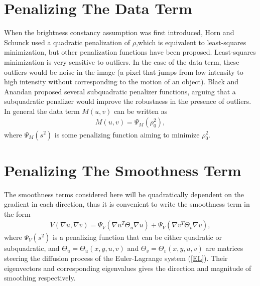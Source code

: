 \section{Penalizing The Data Term}
\label{sec:Data_penalization}
When the brightness constancy assumption was first introduced, Horn and Schunck used a quadratic penalization of $\rho$,which is equivalent to least-squares minimization, but other penalization functions have been proposed. Least-squares minimization is very sensitive to outliers. In the case of the data term, these outliers would be noise in the image (a pixel that jumps from low intensity to high intensity without corresponding to the motion of an object). Black and Anandan \cite{Black199675} proposed several subquadratic penalizer functions, arguing that a subquadratic penalizer would improve the robustness in the presence of outliers. In general the data term $M(u,v)$ can be written as
\begin{align}
\label{DataPenalize}
M(u,v) = \Psi_M(\rho_0^2),
\end{align}
where $\Psi_M(s^2)$ is some penalizing function aiming to minimize $\rho_0^2$. 

\section{Penalizing The Smoothness Term}
The smoothness terms considered here will be quadratically dependent on the gradient in each direction, thus it is convenient to write the smoothness term in the form
\begin{align}
\label{SmoothnessTerm}
V(\nabla u, \nabla v) = \Psi_V(\nabla u ^T \Theta_u \nabla u) + \Psi_V(\nabla v ^T \Theta_v \nabla v),
\end{align}
where $\Psi_V(s^2)$ is a penalizing function that can be either quadratic or subquadratic, and $\Theta_u = \Theta_u(x,y,u,v)$ and $\Theta_v = \Theta_v(x,y,u,v)$ are matrices steering the diffusion process of the Euler-Lagrange system (\ref{EL}). Their eigenvectors and corresponding eigenvalues gives the direction and magnitude of smoothing respectively.

